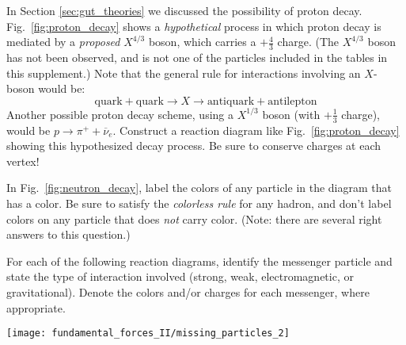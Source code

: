 \begin{problem}
In Section \ref{sec:gut_theories} we discussed the possibility of proton
decay.  Fig.~\ref{fig:proton_decay} shows a {\em hypothetical} process
in which proton decay is mediated by a {\em proposed} $X^{4/3}$ boson,
which carries a $+\textstyle{\frac{4}{3}}$ charge.  (The $X^{4/3}$ boson 
has not been observed, and is not one of the particles included in the 
tables in this supplement.)  Note that the general rule for
interactions involving an $X$-boson would be:
  $$
  \mbox{quark} +\mbox{quark} \to X \to \mbox{antiquark} +
  \mbox{antilepton}
  $$
Another possible proton decay scheme, using a $X^{1/3}$ boson (with
$+\textstyle{\frac{1}{3}}$ charge), would be $p \to \pi^+ + \overline\nu_e$.  Construct
a reaction diagram like Fig.~\ref{fig:proton_decay} showing this 
hypothesized decay process.  Be sure to conserve charges at each vertex!
\label{prob:X_boson}
\end{problem}

\begin{problem}
In Fig.~\ref{fig:neutron_decay}, label the colors of any
particle in the diagram that has a color.  Be sure to satisfy the
{\em colorless rule} for any hadron, and don't label colors on any
particle that does {\em not} carry color.  (Note: there are several
right answers to this question.)
\label{prob:neutron_decay_reaction_diagram}
\end{problem}

\begin{problem}
For each of the following reaction diagrams, identify the
messenger particle and state the type of interaction involved
(strong, weak, electromagnetic, or gravitational).  Denote the
colors and/or charges for each messenger, where appropriate.
\begin{center}
  \texttt{[image: fundamental\_forces\_II/missing\_particles\_2]}
\end{center}
\label{prob:identify_missing_info}
\end{problem}
\vfill



